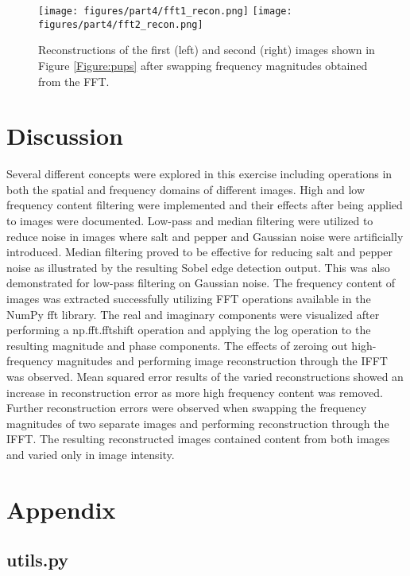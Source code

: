 \documentclass{article}
\begin{document}
\begin{figure}[!ht]
  \centering
  \texttt{[image: figures/part4/fft1\_recon.png]}
  \texttt{[image: figures/part4/fft2\_recon.png]}
  \caption{Reconstructions of the first (left) and second (right) images shown in Figure \ref{Figure:pups} after swapping frequency magnitudes obtained from the FFT.}
  \label{Figure:swappedrecon}
\end{figure}

\section{Discussion}
Several different concepts were explored in this exercise including operations in both the spatial and frequency domains of different images. High and low frequency content filtering were implemented and their effects after being applied to images were documented. Low-pass and median filtering were utilized to reduce noise in images where salt and pepper and Gaussian noise were artificially introduced. Median filtering proved to be effective for reducing salt and pepper noise as illustrated by the resulting Sobel edge detection output. This was also demonstrated for low-pass filtering on Gaussian noise. The frequency content of images was extracted successfully utilizing FFT operations available in the NumPy fft library. The real and imaginary components were visualized after performing a np.fft.fftshift operation and applying the log operation to the resulting magnitude and phase components. The effects of zeroing out high-frequency magnitudes and performing image reconstruction through the IFFT was observed. Mean squared error results of the varied reconstructions showed an increase in reconstruction error as more high frequency content was removed. Further reconstruction errors were observed when swapping the frequency magnitudes of two separate images and performing reconstruction through the IFFT. The resulting reconstructed images contained content from both images and varied only in image intensity.




\section{Appendix}

\subsection{utils.py}

\end{document}
